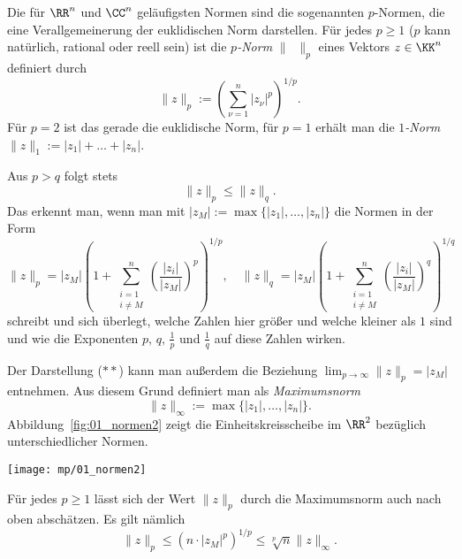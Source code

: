 \begin{antwort}
  Die für $\RR^n$ und $\CC^n$ geläufigsten Normen sind die 
  sogenannten $p$-Normen, die eine Verallgemeinerung der euklidischen 
  Norm darstellen. Für jedes $p\ge 1$ ($p$ kann natürlich, rational 
  oder reell sein) ist die \textit{$p$-Norm} $\|\;\;\|_p$ 
  eines Vektors $z\in \KK^n$ 
  definiert durch
  \[
  \| z \|_p := \left( \sum_{\nu=1}^n \left|z_{\nu}\right|^p \right)^{1/p}.
  \]
  Für $p=2$ ist das gerade die euklidische Norm, für $p=1$ erhält man die 
  \textit{$1$-Norm} $\| z \|_1 := |z_1|+\ldots + |z_n|$. 

  Aus $p>q$ folgt stets 
  \begin{equation}
    \| z \|_p \le \| z \|_q. \tag{$\ast$}
  \end{equation}  
  Das erkennt man, wenn man mit 
  $ |z_M| := \max \{ |z_1|,\ldots, |z_n| \}$ die 
  Normen in der Form
  \begin{equation}
    \| z \|_p = |z_M| \left( 1+ \sum_{\substack{i=1 \\ i\not=M}}^n 
      \left( \frac{|z_i|}{|z_M|} \right)^p \right)^{1/p}, \quad 
    \| z \|_q = |z_M|\left( 1+ \sum_{\substack{i=1 \\ i\not=M}}^n 
      \left( \frac{|z_i|}{|z_M|} \right)^q \right)^{1/q} \tag{$\ast\ast$}
  \end{equation}
  schreibt und sich überlegt, welche Zahlen hier größer und welche 
  kleiner als $1$ sind und wie die 
  Exponenten $p,\,q, \,\frac{1}{p}$ und $\frac{1}{q}$ auf diese Zahlen wirken.

  \noindent
  Der Darstellung ($\ast\ast$) kann man außerdem die Beziehung 
  $\lim_{p\to\infty} \| z \|_p = |z_M|$
  entnehmen. Aus diesem Grund definiert man als \textit{Maximumsnorm} 
  \[
  \| z \|_{\infty} := \max \{|z_1|, \ldots ,|z_n| \}.
  \]
  Abbildung~\ref{fig:01_normen2} zeigt die Einheitskreisscheibe 
  im $\RR^2$ bezüglich unterschiedlicher Normen.
  
  \begin{center}
    \texttt{[image: mp/01\_normen2]}
    \label{fig:01_normen2}
  \end{center}
  
  Für jedes $p\ge 1$ lässt sich der Wert $\|z\|_p$ durch die 
  Maximumsnorm auch nach oben abschätzen. Es gilt nämlich
  \[ 
  \|z\|_p  \le \left( n \cdot \left|z_M\right|^p \right)^{1/p} 
  \le \sqrt[p]{n} \|z\|_\infty. 
  \]


\end{antwort}
